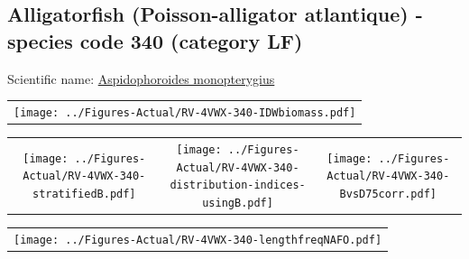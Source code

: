 \documentclass[12pt]{article}\usepackage[]{graphicx}\usepackage[]{color}
\begin{document}
\renewcommand\thefigure{\thesubsection\Alph{figure}}

\setcounter{figure}{0}

\hypertarget{sec:340}{%
\subsection{Alligatorfish (Poisson-alligator atlantique) - species code 340 (category LF)}\label{sec:340}}

  


Scientific name: \href{http://www.marinespecies.org/aphia.php?p=taxdetails\&id=159459}{Aspidophoroides monopterygius} \newline
\begin{minipage}{1.0\textwidth}
 \begin{tabular}{c}
\texttt{[image: ../Figures-Actual/RV-4VWX-340-IDWbiomass.pdf]} \\ 
\end{tabular} 
\end{minipage}
\newline

\vspace{1cm}
\begin{minipage}{1.0\textwidth}
 \begin{tabular}{ccc}
\texttt{[image: ../Figures-Actual/RV-4VWX-340-stratifiedB.pdf]} & 
\texttt{[image: ../Figures-Actual/RV-4VWX-340-distribution-indices-usingB.pdf]} & 
\texttt{[image: ../Figures-Actual/RV-4VWX-340-BvsD75corr.pdf]} \\ 
\end{tabular} 
\end{minipage}
\clearpage
\begin{minipage}{1.0\textwidth}
 \begin{tabular}{c}
\texttt{[image: ../Figures-Actual/RV-4VWX-340-lengthfreqNAFO.pdf]} \\ 
\end{tabular} 
\end{minipage}
\newline
\end{document}
